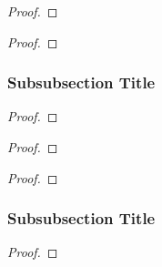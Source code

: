 \begin{proof}
    \lipsum[1]
\end{proof}

\begin{exmp}
    \lipsum[1]
\end{exmp}

\begin{coro}
    \lipsum[1]
\end{coro}

\begin{proof}
    \lipsum[1]
\end{proof}

\subsubsection{Subsubsection Title}

\begin{defn}
    \lipsum[1]
\end{defn}

\begin{lemm}
    \lipsum[1]
\end{lemm}

\begin{proof}
    \lipsum[1]
\end{proof}

\begin{thrm}
    \lipsum[1]
\end{thrm}

\begin{proof}
    \lipsum[1]
\end{proof}

\begin{coro}
    \lipsum[1]
\end{coro}

\begin{proof}
    \lipsum[1]
\end{proof}

\subsubsection{Subsubsection Title}

\begin{lemm}
    \lipsum[1]
\end{lemm}

\begin{proof}
    \lipsum[1]
\end{proof}

\begin{lemm}
    \lipsum[1]
\end{lemm}

